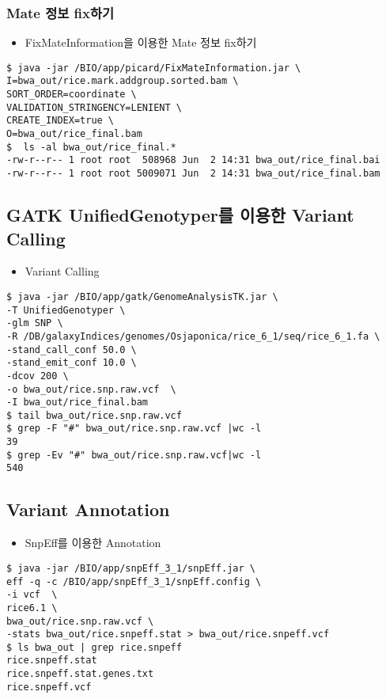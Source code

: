 \documentclass{article}
\begin{document}
\subsubsection{Mate 정보 fix하기}

\begin{itemize}
\item
  \begin{itemize}
  FixMateInformation을 이용한 Mate 정보 fix하기  
  \end{itemize}
\end{itemize}
\begin{lstlisting}[frame=single,style=Bash,xleftmargin=1.4cm,xrightmargin=1.4cm]
$ java -jar /BIO/app/picard/FixMateInformation.jar \
I=bwa_out/rice.mark.addgroup.sorted.bam \
SORT_ORDER=coordinate \
VALIDATION_STRINGENCY=LENIENT \
CREATE_INDEX=true \
O=bwa_out/rice_final.bam
$  ls -al bwa_out/rice_final.*
-rw-r--r-- 1 root root  508968 Jun  2 14:31 bwa_out/rice_final.bai
-rw-r--r-- 1 root root 5009071 Jun  2 14:31 bwa_out/rice_final.bam
\end{lstlisting}





\subsection{GATK UnifiedGenotyper를 이용한 Variant Calling}

\begin{itemize}
\item
  \begin{itemize}
  Variant Calling  
  \end{itemize}
\end{itemize}
\begin{lstlisting}[frame=single,style=Bash,xleftmargin=1.4cm,xrightmargin=1.4cm]
$ java -jar /BIO/app/gatk/GenomeAnalysisTK.jar \
-T UnifiedGenotyper \
-glm SNP \
-R /DB/galaxyIndices/genomes/Osjaponica/rice_6_1/seq/rice_6_1.fa \
-stand_call_conf 50.0 \
-stand_emit_conf 10.0 \
-dcov 200 \
-o bwa_out/rice.snp.raw.vcf  \
-I bwa_out/rice_final.bam
$ tail bwa_out/rice.snp.raw.vcf
$ grep -F "#" bwa_out/rice.snp.raw.vcf |wc -l
39
$ grep -Ev "#" bwa_out/rice.snp.raw.vcf|wc -l
540
\end{lstlisting}

\subsection{Variant Annotation}
\begin{itemize}
\item
  \begin{itemize}
  SnpEff를 이용한 Annotation  
  \end{itemize}
\end{itemize}
\begin{lstlisting}[frame=single,style=Bash,xleftmargin=1.4cm,xrightmargin=1.4cm]
$ java -jar /BIO/app/snpEff_3_1/snpEff.jar \
eff -q -c /BIO/app/snpEff_3_1/snpEff.config \
-i vcf  \
rice6.1 \
bwa_out/rice.snp.raw.vcf \
-stats bwa_out/rice.snpeff.stat > bwa_out/rice.snpeff.vcf
$ ls bwa_out | grep rice.snpeff 
rice.snpeff.stat
rice.snpeff.stat.genes.txt
rice.snpeff.vcf
\end{lstlisting}
\end{document}

